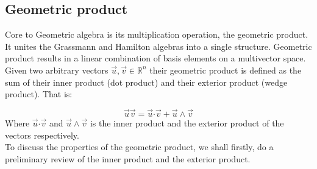\documentclass[12pt,onecolumn,letterpaper]{article} %
\begin{document}
\subsection{Geometric product}
\indent Core to Geometric algebra is its multiplication operation, the geometric product. It unites the Grassmann and Hamilton algebras into a single structure.  Geometric product results in a linear combination of basis elements on a multivector space. Given two arbitrary vectors $\vec{u},\vec{v}\in\mathbb{R}^n$ their geometric product is defined as the sum of their inner product (dot product) and their exterior product (wedge product). That is: 

\begin{equation}\vec{u}\vec{v}=\vec{u} \boldsymbol{\cdot} \vec{v}+\vec{u}\wedge\vec{v}\label{ga1}
\end{equation}
Where $\vec{u} \boldsymbol{\cdot} \vec{v}$ and $\vec{u}\wedge\vec{v}$ is the inner product and the exterior product of the vectors respectively.\\
To discuss the properties of the geometric product, we shall firstly, do a preliminary review of the inner product and the exterior product.
\end{document}
